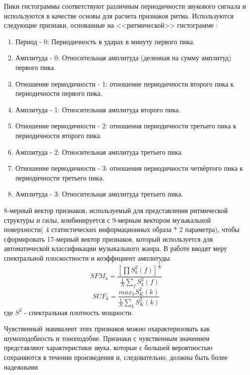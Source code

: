 Пики гистограммы соответствуют различным периодичности звукового сигнала и используются в качестве основы для расчета признаков ритма. Используются следующие признаки, основанные на <<ритмической>> гистограмме :
\begin{enumerate}[label=\arabic*.]
\item Период - 0: Периодичность в ударах в минуту первого пика. 
\item Амплитуда - 0: Относительная амплитуда (деленная на сумму амплитуд) первого пика.
\item Отношение периодичности - 1: отношение периодичности второго пика к периодичности первого пика.
\item Амплитуда - 1: Относительная амплитуда второго пика.
\item Отношение периодичности - 2: отношения периодичности третьего пика к периодичности второго пика.
\item Амплитуда - 2: Относительная амплитуда третьего пика.
\item Отношение периодичности - 3: отношения периодичности четвёртого пика к периодичности третьего пика.
\item Амплитуда - 3: Относительная амплитуда третьего пика.
\end{enumerate}

8-мерный вектор признаков, используемый для представления ритмической структуры и силы, комбинируется с 9-мерным вектором музыкальной поверхности( 4 статистических информационных образа * 2 параметра), чтобы сформировать 17-мерный вектор признаков, который используется для автоматической классификации музыкального жанра.
В работе \cite{src2}  вводят меру спектральной плоскостности и коэффициент амплитуды.
\begin{equation}\label{eq:sfm}
SFM_k= \frac{[\prod S^2_k(f)]^{\frac{1}{N}} }{\frac{1}{N} \sum_f S^2_k(f)}	
\end{equation}
\begin{equation}\label{eq:scf}
SCF_k =  \frac{max_k S^2_K(k)}{\frac{1}{N} \sum_k S^2_K(k)}
\end{equation}
где $ S^2 $ - спектральная плотность мощности.

Чувственный эквивалент этих признаков можно охарактеризовать как шумоподобность и тоноподобие. Признаки с чувственным значением представляют характеристики звука, которые с большей вероятностью сохраняются в течении произведения и, следовательно, должны быть более надежными 

